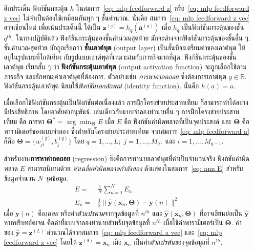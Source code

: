 อีกประเด็น
ฟังก์ชันกระตุ้น $h$ ในสมการ~\ref{eq: mlp feedforward z} หรือ~\ref{eq: mlp feedforward z vec}
ไม่จำเป็นต้องใช้เหมือนกันทุก ๆ ชั้นคำนวณ.
นั่นคือ สมการ~\ref{eq: mlp feedforward z vec} อาจเขียนใหม่ เพื่อเน้นประเด็นนี้ ได้เป็น $\bm{z}^{(q)} = h_q(\bm{a}^{(q)})$
เมื่อ $h_q$ เป็นฟังก์ชันกระตุ้นของชั้น $q^{th}$.
ในทางปฏิบัติแล้ว
ฟังก์ชันกระตุ้นของชั้นคำนวณสุดท้าย
มักจะต่างจากฟังก์ชันกระตุ้นของชั้นอื่น ๆ.
ชั้นคำนวณสุดท้าย มักถูกเรียกว่า
\textbf{ชั้นเอาต์พุต} (output layer)
เป็นชั้นที่จะเตรียมค่าของเอาต์พุต
ให้อยู่ในรูปแบบที่ใกล้เคียง
กับรูปแบบเอาต์พุตที่เหมาะสมกับภารกิจมากที่สุด.
%
ฟังก์ชันกระตุ้นของชั้นเอาต์พุต เรียกสั้น ๆ ว่า 
\textbf{ฟังก์ชันกระตุ้นเอาต์พุต} (output activation function)
จะถูกเลือกใช้ตามภาระกิจ และลักษณะค่าเอาต์พุตที่ต้องการ.
ตัวอย่างเช่น
\textit{การหาค่าถดถอย} ซึ่งต้องการเอาต์พุต $y \in \mathbb{R}$.
	ฟังก์ชันกระตุ้นเอาต์พุต นิยมใช้\textit{ฟังก์ชันเอกลักษณ์} (identity function).
	นั่นคือ $h(a) = a$.
	
เมื่อเลือกใช้ฟังก์ชันกระตุ้นเป็นฟังก์ชันต่อเนื่องแล้ว
การฝึกโครงข่ายประสาทเทียม
ก็สามารถทำได้อย่างมีประสิทธิภาพ
โดยอาศัยค่าอนุพันธ์.
เช่นเดียวกับแบบจำลองทำนายอื่น ๆ
การฝึกโครงข่ายประสาทเทียม
คือ การหา
$\bm{\Theta}^\ast = \arg\min_{\bm{\Theta}} E$
เมื่อ 
$E$ คือ ฟังก์ชันค่าผิดพลาดที่เป็นจุดประสงค์
และ
$\bm{\Theta}$ คือพารามิเตอร์ของแบบจำลอง ซึ่งสำหรับโครงข่ายประสาทเทียม จากสมการ~\ref{eq: mlp feedforward a} ก็คือ 
$\bm{\Theta} = \{ w_{ji}^{(q)}, b_j^{(q)} \}$
โดย $q=1,\ldots,L;$ 
$j=1, \ldots, M_q;$ 
และ $i = 1, \ldots, M_{q-1}$.
%

สำหรับงาน\textbf{การหาค่าถดถอย} (regression)
ซึ่งคือการทำนายเอาต์พุตที่ค่าเป็นจำนวนจริง
ฟังก์ชันค่าผิดพลาด $E$
สามารถนิยามด้วย \textit{ค่าเฉลี่ยค่าผิดพลาดกำลังสอง}
ดังแสดงในสมการ~\ref{eq: ann E} สำหรับข้อมูลจำนวน $N$ จุดข้อมูล.
\begin{align}
E =& \frac{1}{N}\sum_{n=1}^N E_n
\label{eq: ann E} \\
E_n =& \frac{1}{2} \|\bm{\hat{y}}(\bm{x}_n, \bm{\Theta}) - \bm{y}(n)\|^2
\label{eq: ann En}
\end{align}
เมื่อ $\bm{y}(n)$ คือ\textit{เฉลย} หรือค่า\textit{ตัวแปรตาม}จากจุดข้อมูลที่ $n^{th}$
และ $\bm{\hat{y}}(\bm{x}_n, \bm{\Theta})$ ที่อาจเขียนย่อเป็น $\bm{\hat{y}}$ หากบริบทชัดเจน
คือค่าที่แบบจำลองทำนายสำหรับจุดข้อมูลที่ $n^{th}$ เมื่อใช้ค่าพารามิเตอร์เป็น $\bm{\Theta}$.
ค่าของ
$\bm{\hat{y}} = \bm{z}^{(L)}$ 
คำนวณได้จากสมการ~\ref{eq: mlp feedforward a vec}
และ~\ref{eq: mlp feedforward z vec}
โดยให้ $\bm{z}^{(0)} = \bm{x}_n$ 
เมื่อ $\bm{x}_n$
เป็นค่า\textit{ตัวแปรต้น}ของจุดข้อมูลที่ $n^{th}$.

